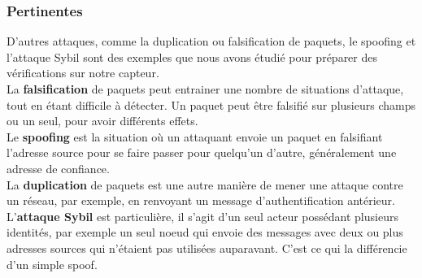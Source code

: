 		\subsubsection{Pertinentes}
			D'autres attaques, comme la duplication ou falsification de paquets, le spoofing et l'attaque Sybil sont des exemples que nous avons étudié pour préparer des vérifications sur notre capteur.\\
			
			La \textbf{falsification} de paquets peut entrainer une nombre de situations d'attaque, tout en étant difficile à détecter. Un paquet peut être falsifié sur plusieurs champs ou un seul, pour avoir différents effets.\\
			Le \textbf{spoofing} est la situation où un attaquant envoie un paquet en falsifiant l'adresse source pour se faire passer pour quelqu'un d'autre, généralement une adresse de confiance.\\
			La \textbf{duplication} de paquets est une autre manière de mener une attaque contre un réseau, par exemple, en renvoyant un message d'authentification antérieur.\\
			L'\textbf{attaque Sybil} est particulière, il s'agit d'un seul acteur possédant plusieurs identités, par exemple un seul noeud qui envoie des messages avec deux ou plus adresses sources qui n'étaient pas utilisées auparavant. C'est ce qui la différencie d'un simple spoof.


